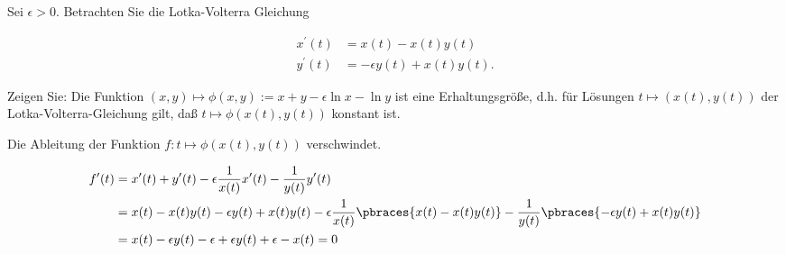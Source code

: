 \begin{exercise}

Sei $\epsilon > 0$. Betrachten Sie die  Lotka-Volterra Gleichung

\begin{align*}
  x^\prime(t) & = x(t) - x(t) y(t) \\
  y^\prime(t) & = -\epsilon y(t) + x(t) y(t).
\end{align*}

Zeigen Sie: Die Funktion $(x, y) \mapsto \phi(x, y) := x + y - \epsilon \ln{x} - \ln{y}$ ist eine Erhaltungsgröße, d.h. für Lösungen $t \mapsto (x(t), y(t))$ der Lotka-Volterra-Gleichung gilt, daß $t \mapsto \phi(x(t), y(t))$ konstant ist.

\end{exercise}

\begin{solution}

Die Ableitung der Funktion $f: t \mapsto \phi(x(t), y(t))$ verschwindet.

\begin{align*}
  f^\prime(t)
  & =
  x^\prime(t) +
  y^\prime(t) -
  \epsilon
  \frac{1}{x(t)} x^\prime(t) -
  \frac{1}{y(t)} y^\prime(t) \\
  & =
  x(t) - x(t) y(t) -
  \epsilon
  y(t) + x(t) y(t) -
  \epsilon
  \frac{1}{x(t)}
  \pbraces
  {
    x(t) - x(t) y(t)
  } -
  \frac{1}{y(t)}
  \pbraces
  {
    -\epsilon
    y(t) + x(t) y(t)
  } \\
  & =
  x(t) - \epsilon y(t) - \epsilon + \epsilon y(t) + \epsilon - x(t) = 0
\end{align*}

\end{solution}
